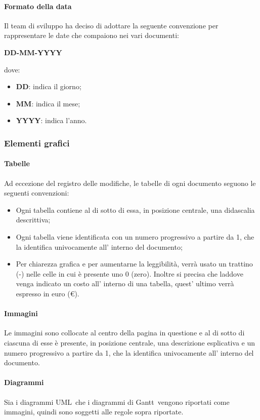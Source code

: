 \paragraph{Formato della data}
Il team di sviluppo ha deciso di adottare la seguente convenzione per rappresentare le date che compaiono nei vari documenti:
\begin{center}
    \large{\textbf{DD-MM-YYYY}}
\end{center}
dove:
\begin{itemize}
    \item \textbf{DD}: indica il giorno;
    \item \textbf{MM}: indica il mese;
    \item \textbf{YYYY}: indica l'anno.
\end{itemize}

\subsubsection{Elementi grafici}
\paragraph{Tabelle}
Ad eccezione del registro delle modifiche, le tabelle di ogni documento seguono le seguenti convenzioni:
\begin{itemize}
    \item Ogni tabella contiene al di sotto di essa, in posizione centrale, una didascalia descrittiva;
    \item Ogni tabella viene identificata con un numero progressivo a partire da 1, che la identifica univocamente all' interno del documento;
    \item Per chiarezza grafica e per aumentarne la leggibilità, verrà usato un trattino (-) nelle celle in cui è presente uno 0 (zero). Inoltre si precisa che laddove venga indicato un costo all' interno di una tabella, quest' ultimo verrà espresso in euro (€).
\end{itemize}
\paragraph{Immagini}
Le immagini sono collocate al centro della pagina in questione e al di sotto di ciascuna di esse è presente, in posizione centrale, una descrizione esplicativa e un numero progressivo a partire da 1, che la identifica univocamente all' interno del documento.
\paragraph{Diagrammi}
Sia i diagrammi UML\glo\ che i diagrammi di Gantt\glo\ vengono riportati come immagini, quindi sono soggetti alle regole sopra riportate.
